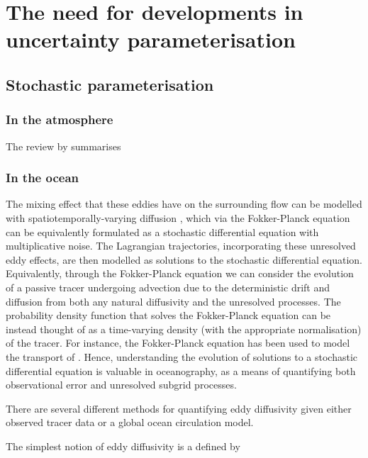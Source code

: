 \chapter{The need for developments in uncertainty parameterisation}

\section{Stochastic parameterisation}



\subsection{In the atmosphere}

The review by \citet{BernerEtAl_2017_StochasticParameterizationNew} summarises



\subsection{In the ocean}



The mixing effect that these eddies have on the surrounding flow can be modelled with spatiotemporally-varying diffusion \citehere, which via the Fokker-Planck equation can be equivalently formulated as a stochastic differential equation with multiplicative noise.
The Lagrangian trajectories, incorporating these unresolved eddy effects, are then modelled as solutions to the stochastic differential equation.
Equivalently, through the Fokker-Planck equation we can consider the evolution of a passive tracer undergoing advection due to the deterministic drift and diffusion from both any natural diffusivity and the unresolved processes.
The probability density function that solves the Fokker-Planck equation can be instead thought of as a time-varying density (with the appropriate normalisation) of the tracer.
For instance, the Fokker-Planck equation has been used to model the transport of \citehere.
Hence, understanding the evolution of solutions to a stochastic differential equation is valuable in oceanography, as a means of quantifying both observational error and unresolved subgrid processes.


There are several different methods for quantifying eddy diffusivity given either observed tracer data or a global ocean circulation model.

The simplest notion of eddy diffusivity is a defined by






